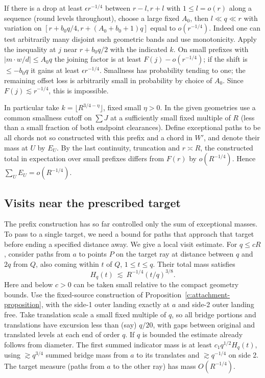 \documentclass[11pt]{article}
\numberwithin{equation}{section}
\theoremstyle{definition}\newtheorem{definition}[theorem]{Definition}
\theoremstyle{remark}\newtheorem{remark}[theorem]{Remark}
\begin{document}
If there is a drop at least \(\epsilon r^{-1/4}\) between \(r-l,r+l\) with \(1\le l=o(r)\) along a sequence (round levels throughout), choose a large fixed \(A_0\), then \(l\ll q\ll r\) with variation on \([r+b_0 q/4,r+(A_0+b_0+1)q]\) equal to \(o(r^{-1/4})\). Indeed one can test arbitrarily many disjoint such geometric bands and use monotonicity. Apply the inequality at \(j\) near \(r+b_0 q/2\) with the indicated \(k\). On small prefixes with \(|m\cdot w/d|\le A_0 q\) the joining factor is at least \(F(j)-o(r^{-1/4})\); if the shift is \(\le-b_0 q\) it gains at least \(\epsilon r^{-1/4}\). Smallness has probability tending to one; the remaining offset loss is arbitrarily small in probability by choice of \(A_0\). Since \(F(j)\lesssim r^{-1/4}\), this is impossible.



In particular take \(k=\lfloor R^{3/4-\eta}\rfloor\), fixed small \(\eta>0\). In the given geometries use a common smallness cutoff on \(\sum J\) at a sufficiently small fixed multiple of \(R\) (less than a small fraction of both endpoint clearances). Define exceptional paths to be all chords not so constructed with this prefix and a chord in \(W'\), and denote their mass at \(U\) by \(E_U\). By the last continuity, truncation and \(r\asymp R\), the constructed total in expectation over small prefixes differs from \(F(r)\) by \(o(R^{-1/4})\). Hence \(\sum_U E_U=o(R^{-1/4})\).



\subsection{Visits near the prescribed target}\label{c:tilted-visits}
The prefix construction has so far controlled only the sum of exceptional
masses. To pass to a single target, we need a bound for paths that approach
that target before ending a specified distance away. We give a local visit estimate. For \(q\le cR\), consider paths from \(a\) to points \(P\) on the target ray at distance between \(q\) and \(2q\) from \(Q\), also coming within \(t\) of \(Q\), \(1\le t\le q\). Their total mass satisfies
\begin{equation}\label{c:tilted-visit-bound}
 H_q(t)\ \lesssim\ R^{-1/4}(t/q)^{3/8}.
\end{equation}
Here and below \(c>0\) can be taken small relative to the compact geometry bounds. Use the fixed-source construction of Proposition~\ref{c:attachment-proposition}, with the side-1 outer landing exactly at \(a\) and side-2 outer landing free. Take translation scale a small fixed multiple of \(q\), so all bridge portions and translations have excursion less than (say) \(q/20\), with gaps between original and translated levels at each end of order \(q\). If \(q\) is bounded the estimate already follows from diameter. The first summed indicator mass is at least \(c_1 q^{1/2}H_q(t)\), using \(\gtrsim q^{3/4}\) summed bridge mass from \(a\) to its translates and \(\gtrsim q^{-1/4}\) on side 2. The target measure (paths from \(a\) to the other ray) has mass \(O(R^{-1/4})\).
\end{document}
